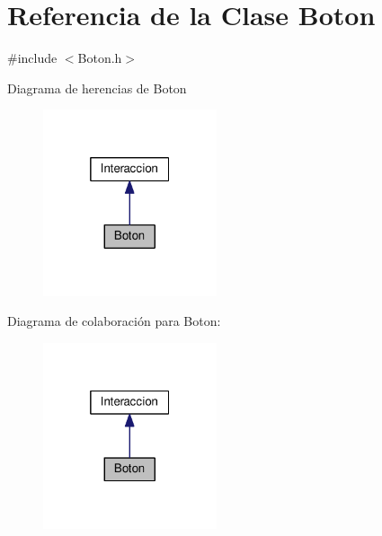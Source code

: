 \hypertarget{classBoton}{}\section{Referencia de la Clase Boton}
\label{classBoton}


{\ttfamily \#include $<$Boton.\+h$>$}



Diagrama de herencias de Boton
\nopagebreak
\begin{figure}[H]
\begin{center}
\leavevmode
\includegraphics[width=145pt]{classBoton__inherit__graph}
\end{center}
\end{figure}


Diagrama de colaboración para Boton\+:
\nopagebreak
\begin{figure}[H]
\begin{center}
\leavevmode
\includegraphics[width=145pt]{classBoton__coll__graph}
\end{center}
\end{figure}
